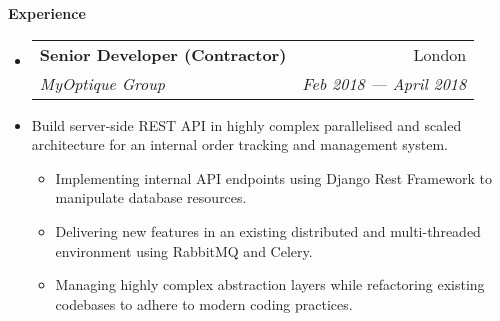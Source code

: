 \documentclass[letterpaper,11pt]{article}
\makeatletter
\newlength{\headinglength}
\newcommand{\resheading}[1]{{\large \colorbox{mygrey}
        {\begin{minipage}{\headinglength}
            {\textbf{#1 \vphantom{p\^{E}}}}
        \end{minipage}}}}
\newcommand{\ressubheading}[4]
    {\begin{tabular*}{180mm}{l@{\extracolsep{\fill}}r}
        \textbf{#1} & #2 \\
        \textit{#3} & \textit{#4} \\
    \end{tabular*}\vspace{-6pt}}
\newcommand{\resdescription}[1]{#1 \vspace{-0mm}}
\newcommand{\resitem}[1]{\item #1 \vspace{-2pt}}
\makeatother
\begin{document}
    \resheading{Experience}
    \begin{itemize}
        \item[]
            \ressubheading{Senior Developer (Contractor)}{London}{MyOptique Group}{Feb 2018 --- April 2018}
        \item[]
            \resdescription{Build server-side REST API in highly complex parallelised and scaled architecture for an internal order tracking and management system.}
            \begin{itemize}
                    \resitem{Implementing internal API endpoints using Django Rest Framework to manipulate database resources.}
                    \resitem{Delivering new features in an existing distributed and multi-threaded environment using RabbitMQ and Celery.}
                    \resitem{Managing highly complex abstraction layers while refactoring existing codebases to adhere to modern coding practices.}
            \end{itemize}


\end{itemize}
\end{document}

